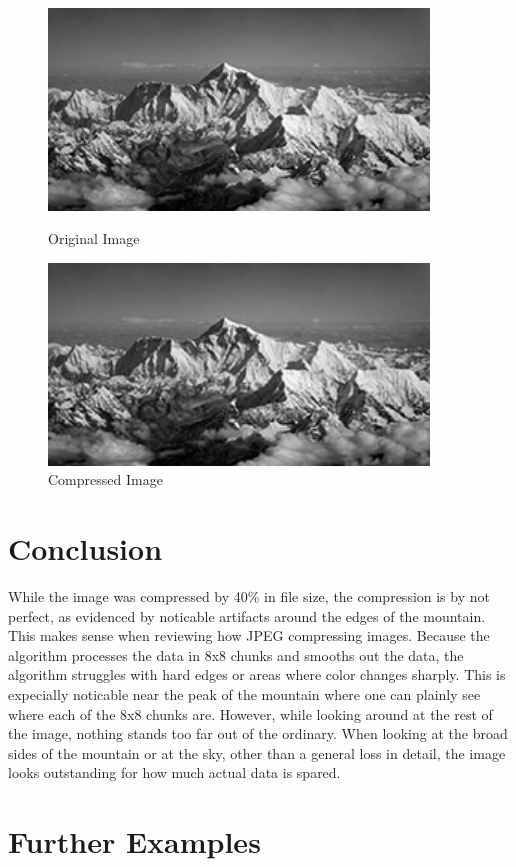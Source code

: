\documentclass[11pt]{article}
\begin{document}
\begin{figure}
  \centering
  \begin{minipage}{0.45\textwidth}
      \centering
      \includegraphics[width=0.9\textwidth]{./images/original.jpg}
      \caption{Original Image}
      \label{fig:original}
  \end{minipage}\hfill
  \begin{minipage}{0.45\textwidth}
      \centering
      \includegraphics[width=0.9\textwidth]{./images/compressed.jpg}
      \caption{Compressed Image}
      \label{fig:compressed}
  \end{minipage}
\end{figure}

\section{Conclusion}
\label{sec: conclusion}

While the image was compressed by 40\% in file size, the compression is by not perfect, as evidenced by noticable artifacts around the edges of the mountain.
This makes sense when reviewing how JPEG compressing images.
Because the algorithm processes the data in 8x8 chunks and smooths out the data, the algorithm struggles with hard edges or areas where color changes sharply.
This is expecially noticable near the peak of the mountain where one can plainly see where each of the 8x8 chunks are.
However, while looking around at the rest of the image, nothing stands too far out of the ordinary.
When looking at the broad sides of the mountain or at the sky, other than a general loss in detail, the image looks outstanding for how much actual data is spared.

\section{Further Examples}
\label{sec: furtherexamples}

\begingroup
  \raggedright

  \nocite{*}
  
  
\endgroup
\end{document}
